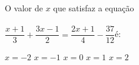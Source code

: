 O valor de $x$ que satisfaz a equação\\\vspace{-3mm}\\ $\dfrac{x+1}{3}+\dfrac{3x-1}{2}=\dfrac{2x+1}{4}-\dfrac{37}{12}$\quad é:

$x=-2$
$x=-1$
$x=0$
$x=1$
$x=2$




